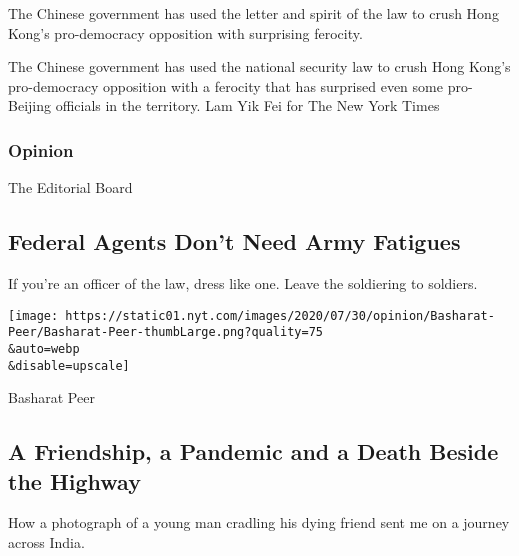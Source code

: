 The Chinese government has used the letter and spirit of the law to
crush Hong Kong's pro-democracy opposition with surprising ferocity.

\href{/2020/07/31/world/asia/hong-kong-election-national-security-law.html}{}

The Chinese government has used the national security law to crush Hong
Kong's pro-democracy opposition with a ferocity that has surprised even
some pro-Beijing officials in the territory. Lam Yik Fei for The New
York Times

\href{https://www.nytimes.com/section/opinion?pagetype=Homepage\&action=click\&module=Opinion}{}

\hypertarget{opinion}{%
\subsubsection{Opinion}\label{opinion}}

\href{/2020/07/31/opinion/federal-agents-trump-uniforms.html}{}

The Editorial Board

\hypertarget{federal-agents-dont-need-army-fatigues}{%
\subsection{Federal Agents Don't Need Army
Fatigues}\label{federal-agents-dont-need-army-fatigues}}

If you're an officer of the law, dress like one. Leave the soldiering to
soldiers.

\href{/2020/07/31/opinion/sunday/India-migration-coronavirus.html}{}

\texttt{[image: https://static01.nyt.com/images/2020/07/30/opinion/Basharat-Peer/Basharat-Peer-thumbLarge.png?quality=75\\\&auto=webp\\\&disable=upscale]}

Basharat Peer

\hypertarget{a-friendship-a-pandemic-and-a-death-beside-the-highway}{%
\subsection{A Friendship, a Pandemic and a Death Beside the
Highway}\label{a-friendship-a-pandemic-and-a-death-beside-the-highway}}

How a photograph of a young man cradling his dying friend sent me on a
journey across India.

\href{/2020/07/31/opinion/sunday/India-migration-coronavirus.html}{}

